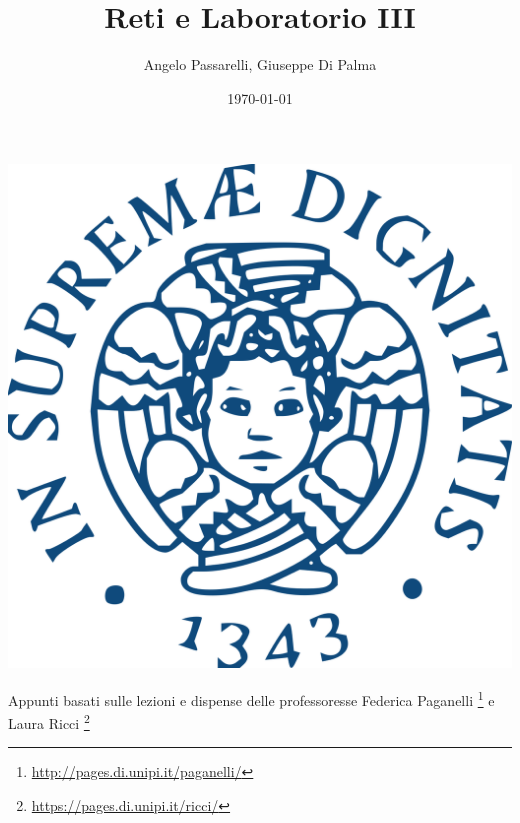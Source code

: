 \documentclass{article}
\title{Reti e Laboratorio III}
\author{Angelo Passarelli, Giuseppe Di Palma}
\date{\today}
\theoremstyle{definition}
\begin{document}
    
    \maketitle
    \begin{center}
        \includegraphics[scale=0.15]{Stemma_unipi.png}
    \end{center}
    \vspace{1cm}
    \begin{center}
        Appunti basati sulle lezioni e dispense delle professoresse Federica Paganelli \footnote{\url{http://pages.di.unipi.it/paganelli/}}
        e Laura Ricci \footnote{\url{https://pages.di.unipi.it/ricci/}}
    \end{center}
    \pagebreak
    \tableofcontents
    \pagebreak

    \begin{sloppypar}


    \end{sloppypar}
\end{document}
